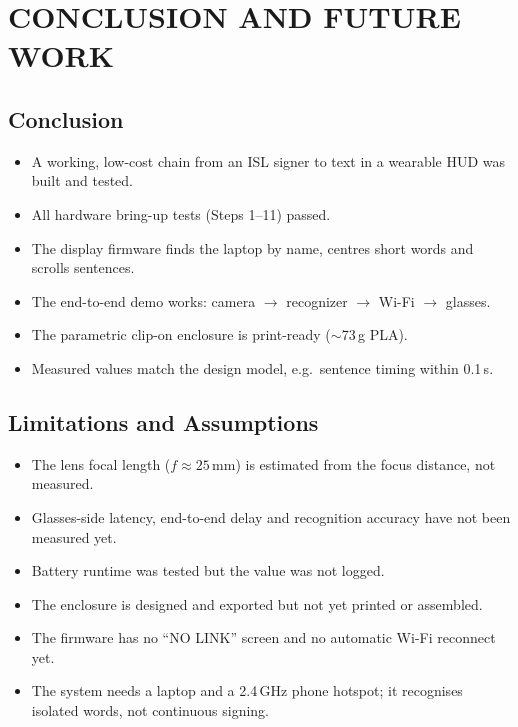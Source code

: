 \documentclass[12pt,a4paper]{report}
\begin{document}
\chapter{CONCLUSION AND FUTURE WORK}

\section{Conclusion}
\begin{itemize}
  \item A working, low-cost chain from an ISL signer to text in a wearable HUD was built and tested.
  \item All hardware bring-up tests (Steps 1--11) passed.
  \item The display firmware finds the laptop by name, centres short words and scrolls sentences.
  \item The end-to-end demo works: camera $\rightarrow$ recognizer $\rightarrow$ Wi-Fi $\rightarrow$ glasses.
  \item The parametric clip-on enclosure is print-ready ($\sim$73\,g PLA).
  \item Measured values match the design model, e.g.\ sentence timing within 0.1\,s.
\end{itemize}

\section{Limitations and Assumptions}
\begin{itemize}
  \item The lens focal length ($f \approx 25$\,mm) is estimated from the focus distance, not measured.
  \item Glasses-side latency, end-to-end delay and recognition accuracy have not been measured yet.
  \item Battery runtime was tested but the value was not logged.
  \item The enclosure is designed and exported but not yet printed or assembled.
  \item The firmware has no ``NO LINK'' screen and no automatic Wi-Fi reconnect yet.
  \item The system needs a laptop and a 2.4\,GHz phone hotspot; it recognises isolated words, not continuous signing.
\end{itemize}
\end{document}

